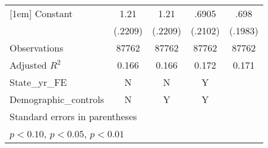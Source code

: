 \begin{table}[htbp]
\begin{tabular}{l*{4}{c}}
[1em]
Constant            &        1.21\sym{***}&        1.21\sym{***}&       .6905\sym{***}&        .698\sym{***}\\
                    &     (.2209)         &     (.2209)         &     (.2102)         &     (.1983)         \\
\hline
Observations        &       87762         &       87762         &       87762         &       87762         \\
Adjusted \(R^{2}\)  &       0.166         &       0.166         &       0.172         &       0.171         \\
State\_yr\_FE         &           N         &           N         &           Y         &                     \\
Demographic\_controls&           N         &           Y         &           Y         &                     \\
\hline\hline
\multicolumn{5}{l}{\footnotesize Standard errors in parentheses}\\
\multicolumn{5}{l}{\footnotesize \sym{*} \(p<0.10\), \sym{**} \(p<0.05\), \sym{***} \(p<0.01\)}\\
\end{tabular}
\end{table}
